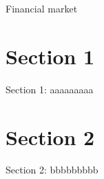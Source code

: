 \minitoc

\vspace{0.5cm}
Financial market 

\section{Section 1}
Section 1: aaaaaaaaa

\section{Section 2}
Section 2: bbbbbbbbb